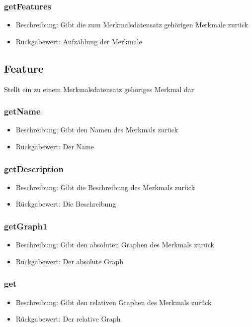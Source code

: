 \documentclass[a4paper]{scrreprt}
\begin{document}
   \subsubsection{getFeatures}
      \begin{itemize}
         \item Beschreibung: Gibt die zum Merkmalsdatensatz gehörigen Merkmale zurück
         \item Rückgabewert: Aufzählung der Merkmale
      \end{itemize}
   
   \subsection{Feature}
   Stellt ein zu einem Merkmalsdatensatz gehöriges Merkmal dar
   \subsubsection{getName}
      \begin{itemize}
          \item Beschreibung: Gibt den Namen des Merkmals zurück
          \item Rückgabewert: Der Name
      \end{itemize}
   \subsubsection{getDescription}
      \begin{itemize}
          \item Beschreibung: Gibt die Beschreibung des Merkmals zurück
          \item Rückgabewert: Die Beschreibung
      \end{itemize}
   \subsubsection{getGraph1}
      \begin{itemize}
          \item Beschreibung: Gibt den absoluten Graphen des Merkmals zurück
          \item Rückgabewert: Der absolute Graph
      \end{itemize}
   \subsubsection{get}
      \begin{itemize}
          \item Beschreibung: Gibt den relativen Graphen des Merkmals zurück
          \item Rückgabewert: Der relative Graph
      \end{itemize}
   
\end{document}

